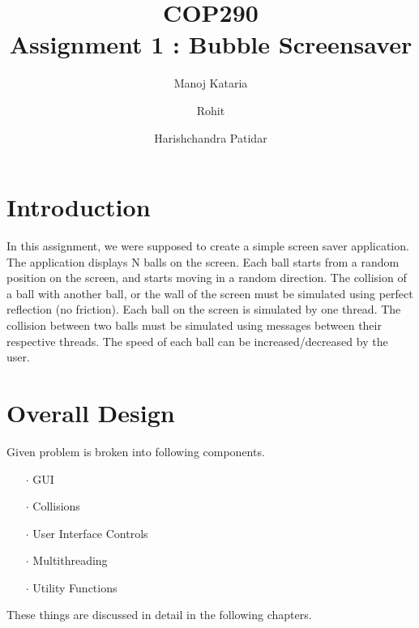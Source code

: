 \documentclass[a4paper,12pt]{report}
\begin{document}
\title{COP290 \\ Assignment 1 : Bubble Screensaver}
\author{Manoj Kataria\and Rohit\and Harishchandra Patidar}
\maketitle

\newpage
\tableofcontents
\newpage

\chapter{Introduction}
In this assignment, we were supposed to create a simple screen saver application. The application displays N balls on the screen. Each ball starts from a random position on the screen, and starts moving in a random direction. The collision of a ball with another ball, or the wall of the screen must be simulated using perfect reflection (no friction). Each ball on the screen is simulated by one thread. The collision between two balls must be simulated using messages between their respective threads. The speed of each ball can be increased/decreased by the user.
\chapter{Overall Design}
Given problem is broken into following components.
\begin{itemize}
\item[$\cdot$] GUI
\item[$\cdot$] Collisions
\item[$\cdot$] User Interface Controls
\item[$\cdot$] Multithreading
\item[$\cdot$] Utility Functions
\end{itemize}
These things are discussed in detail in the following chapters.
\end{document}
